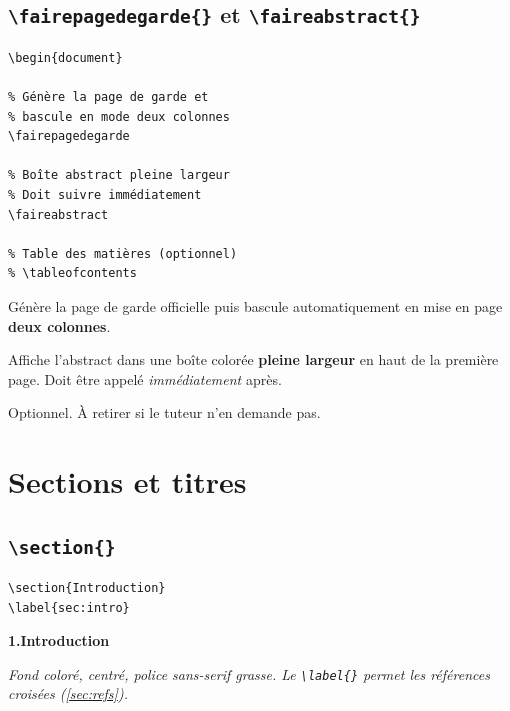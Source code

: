\documentclass[12pt, a4paper]{article}
\newcommand{\simsection}[2][1]{%
  \colorbox{ENSbg}{\parbox{\dimexpr\linewidth-2\fboxsep\relax}{%
    \centering\color{ENSorange}\sffamily\bfseries\normalsize
    #1.\enspace #2}}\par}
\begin{document}
\subsection[\texttt{\textbackslash fairepagedegarde} et \texttt{\textbackslash faireabstract}]{\texttt{\textbackslash fairepagedegarde\{\}} et \texttt{\textbackslash faireabstract\{\}}}

\begin{demo}
\begin{lstlisting}[style=latexcode]
\begin{document}

% Génère la page de garde et
% bascule en mode deux colonnes
\fairepagedegarde

% Boîte abstract pleine largeur
% Doit suivre immédiatement
\faireabstract

% Table des matières (optionnel)
% \tableofcontents
\end{lstlisting}
\tcblower
\footnotesize
\begin{description}[noitemsep]
  \item[\texttt{\textbackslash fairepagedegarde}] Génère la page de garde officielle puis bascule automatiquement en mise en page \textbf{deux colonnes}.
  \item[\texttt{\textbackslash faireabstract}] Affiche l'abstract dans une boîte colorée \textbf{pleine largeur} en haut de la première page. Doit être appelé \textit{immédiatement} après.
  \item[\texttt{\textbackslash tableofcontents}] Optionnel. À retirer si le tuteur n'en demande pas.
\end{description}
\end{demo}

\newpage

\section{Sections et titres}

\subsection{\texttt{\textbackslash section\{\}}}

\begin{demo}
\begin{lstlisting}[style=latexcode]
\section{Introduction}
\label{sec:intro}
\end{lstlisting}
\tcblower
\simsection{Introduction}
\vspace{4pt}
{\footnotesize\itshape Fond coloré, centré, police sans-serif grasse. Le \texttt{\textbackslash label\{\}} permet les références croisées (\autoref{sec:refs}).}
\end{demo}
\end{document}
